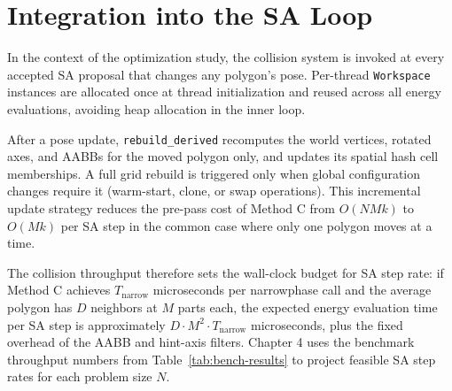 \section{Integration into the SA Loop}

In the context of the optimization study, the collision system is
invoked at every accepted SA proposal that changes any polygon's pose.
Per-thread \texttt{Workspace} instances are allocated once at
thread initialization and reused across all energy evaluations,
avoiding heap allocation in the inner loop.

After a pose update, \texttt{rebuild\_derived} recomputes the world
vertices, rotated axes, and AABBs for the moved polygon only, and
updates its spatial hash cell memberships. A full grid rebuild is
triggered only when global configuration changes require it
(warm-start, clone, or swap operations).
This incremental update strategy reduces the pre-pass cost of
Method C from $O(NMk)$ to $O(Mk)$ per SA step in the common case
where only one polygon moves at a time.

The collision throughput therefore sets the wall-clock budget for
SA step rate: if Method C achieves $T_{\mathrm{narrow}}$ microseconds
per narrowphase call and the average polygon has $D$ neighbors at
$M$ parts each, the expected energy evaluation time per SA step is
approximately $D \cdot M^2 \cdot T_{\mathrm{narrow}}$ microseconds,
plus the fixed overhead of the AABB and hint-axis filters.
Chapter 4 uses the benchmark throughput numbers from
Table~\ref{tab:bench-results} to project feasible SA step rates for
each problem size $N$.
